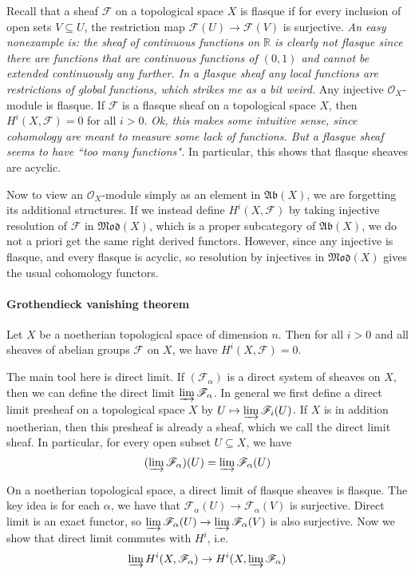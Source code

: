 \documentclass[12pt]{article}
\theoremstyle{plain}
\theoremstyle{definition}
\newcommand{\IR}{\mathbb{R}}
\newcommand{\sO}{\mathcal{O}}
\newcommand{\shF}{\mathscr{F}}
\newcommand{\<}{\langle}
\renewcommand{\>}{\rangle}
\newcommand{\dirlim}{\varinjlim}
\newcommand{\Mod}{\mathfrak{Mod}}
\newcommand{\Ab}{\mathfrak{Ab}}
\begin{document}
Recall that a sheaf $\shF$ on a topological space $X$ is flasque if for every inclusion of open sets $V \subseteq U$, the restriction map $\shF(U) \to \shF(V)$ is surjective. \textit{An easy nonexample is: the sheaf of continuous functions on $\IR$ is clearly not flasque since there are functions that are continuous functions of $(0, 1)$ and cannot be extended continuously any further. In a flasque sheaf any local functions are restrictions of global functions, which strikes me as a bit weird.} Any injective $\sO_X$-module is flasque. If $\shF$ is a flasque sheaf on a topological space $X$, then $H^i(X, \shF) = 0$ for all $i > 0$. \textit{Ok, this makes some intuitive sense, since cohomology are meant to measure some lack of functions. But a flasque sheaf seems to have ``too many functions".} In particular, this shows that flasque sheaves are acyclic. 

Now to view an $\sO_X$-module simply as an element in $\Ab(X)$, we are forgetting its additional structures. If we instead define $H^i(X, \shF)$ by taking injective resolution of $\shF$ in $\Mod(X)$, which is a proper subcategory of $\Ab(X)$, we do not a priori get the same right derived functors. However, since any injective is flasque, and every flasque is acyclic, so resolution by injectives in $\Mod(X)$ gives the usual cohomology functors. 

\paragraph{Grothendieck vanishing theorem}

Let $X$ be a noetherian topological space of dimension $n$. Then for all $i > 0$ and all sheaves of abelian groups $\shF$ on $X$, we have $H^i(X, \shF) = 0$. 

The main tool here is direct limit. If $(\shF_\alpha)$ is a direct system of sheaves on $X$, then we can define the direct limit $\dirlim \shF_\alpha$. In general we first define a direct limit presheaf on a topological space $X$ by $U \mapsto \dirlim \shF_i(U)$. If $X$ is in addition noetherian, then this presheaf is already a sheaf, which we call the direct limit sheaf. In particular, for every open subset $U \subseteq X$, we have 
$$ (\dirlim \shF_\alpha)(U) = \dirlim \shF_\alpha (U)$$ 

On a noetherian topological space, a direct limit of flasque sheaves is flasque. The key idea is for each $\alpha$, we have that $\shF_\alpha(U) \to \shF_\alpha(V)$ is surjective. Direct limit is an exact functor, so $\dirlim \shF_\alpha(U) \to \dirlim \shF_\alpha(V)$ is also surjective. Now we show that direct limit commutes with $H^i$, i.e. 
$$ \dirlim H^i(X, \shF_\alpha) \to H^i(X, \dirlim \shF_\alpha) $$
\end{document}
